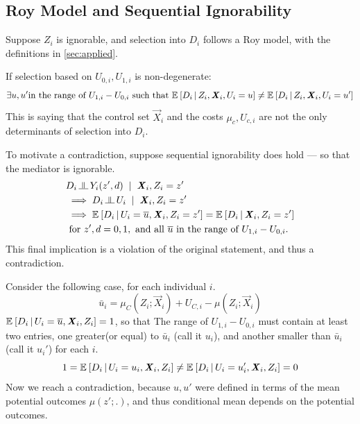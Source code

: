 
\subsection{Roy Model and Sequential Ignorability}
\label{appendix:roy-seq-ig}
Suppose $Z_i$ is ignorable, and selection into $D_i$ follows a Roy model, with the definitions in \autoref{sec:applied}.

If selection based on $U_{0,i}, U_{1,i}$ is non-degenerate:
\[ \exists u, u' \text{in the range of $U_{1,i}- U_{0,i}$ such that }
    \mathbb{E}_{} \left[ D_i \, \middle\vert \, Z_i, \boldsymbol{\mathit{X}}_i, U_i = u \right]
    \neq \mathbb{E}_{} \left[ D_i \, \middle\vert \, Z_i, \boldsymbol{\mathit{X}}_i, U_i = u' \right] \]
This is saying that the control set $\vec X_i$ and the costs $\mu_c, U_{c,i}$ are not the only determinants of selection into $D_i$.

To motivate a contradiction, suppose sequential ignorability does hold --- so that the mediator is ignorable.
\begin{align*}
    & D_i \indep Y_i(z', d) \;\; | \;\; \vec X_i, Z_i = z' \\
    &\implies D_i \indep U_i \;\; | \;\; \vec X_i, Z_i = z' \\
    &\implies \Egiven{D_i}{U_i = \bar u, \vec X_i, Z_i = z'}
    = \Egiven{D_i}{\vec X_i, Z_i = z'} \\
    & \textnormal{ for } z', d = 0, 1,
        \text{ and all } \bar u \text{ in the range of $U_{1,i}- U_{0,i}$.}
\end{align*}
This final implication is a violation of the original statement, and thus a contradiction.

Consider the following case, for each individual $i$.
\[ \bar u_i = \mu_C(Z_i ; \vec X_i) + U_{C,i} - \mu(Z_i ; \vec X_i) \]
$\mathbb{E}_{} \left[ D_i \, \middle\vert \, U_i = \overline{u}, \boldsymbol{\mathit{X}}_i, Z_i \right] = 1$, so that
The range of $U_{1,i}- U_{0,i}$ must contain at least two entries, one greater(or equal) to $\bar u_i$ (call it $u_i$), and another smaller than $\bar u_i$ (call it $u_i'$) for each $i$.
\[ 1 = \mathbb{E}_{} \left[ D_i \, \middle\vert \, U_i = u_i, \boldsymbol{\mathit{X}}_i, Z_i \right] \neq 
\mathbb{E}_{} \left[ D_i \, \middle\vert \, U_i = u_i', \boldsymbol{\mathit{X}}_i, Z_i \right] = 0 \]
Now we reach a contradiction, because $u, u'$ were defined in terms of the mean potential outcomes $\mu(z';.)$, and thus conditional mean depends on the potential outcomes.


